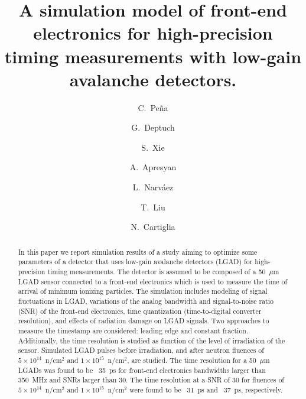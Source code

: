 \documentclass[preprint,1p]{elsarticle}
\begin{document}
\linenumbers

\begin{frontmatter}



\title{A simulation model of front-end electronics for high-precision timing measurements with low-gain avalanche detectors.}


\author[1,2]{C.~Pe\~na}
\author[1]{G.~Deptuch}
\author[2]{S.~Xie}
\author[1]{A.~Apresyan}
\author[2]{L.~Narv\'aez}
\author[1]{T.~Liu}
\author[3]{N.~Cartiglia}


\address[1]{Fermi National Accelerator Laboratory, Batavia, IL, USA}
\address[2]{California Institute of Technology, Pasadena, CA, USA}
\address[3]{INFN, Torino, Italy}

\begin{abstract}
In this paper we report simulation results of a study aiming to optimize some
parameters of a detector that uses low-gain avalanche detectors (LGAD) for
high-precision timing measurements. The detector is assumed to be composed of a
50~$\mu$m LGAD sensor connected to a front-end electronics which is used to
measure the time of arrival of minimum ionizing particles. The simulation
includes modeling of signal fluctuations in LGAD, variations of the analog
bandwidth and signal-to-noise ratio (SNR) of the front-end electronics, time
quantization (time-to-digital converter resolution), and effects of radiation damage on LGAD signals. Two approaches to
measure the timestamp are considered: leading edge and constant fraction.
Additionally, the time resolution is studied as function of the level of
irradiation of the sensor. Simulated LGAD pulses before irradiation, and after
neutron fluences of $5\times 10^{14}$~n/cm$^2$ and $1\times 10^{15}$~n/cm$^2$,
are studied. The time resolution for a 50~$\mu$m LGADs was found to be ~35~\si{ps}
for front-end electronics bandwidths larger than 350~\si{MHz} and SNRs larger
than 30. The time resolution at a SNR of 30 for fluences of $5\times
10^{14}$~n/cm$^2$ and $1\times 10^{15}$~n/cm$^2$ were found to be ~31~\si{ps}
and ~37~\si{ps}, respectively.
\end{abstract}


\end{frontmatter}
\end{document}
